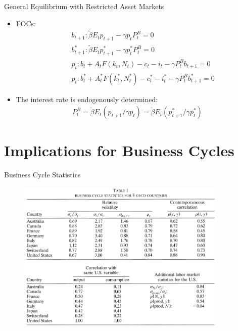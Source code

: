 \documentclass[10pt]{beamer}
\begin{document}
\begin{frame}{General Equilibrium with Restricted Asset Markets}
\begin{itemize}
\item FOCs:
\begin{eqnarray}
&&b_{t+1}:\tilde{\beta}E_tp_{t+1}-\gamma p_tP_t^B=0 \\
&&b_{t+1}^*:\tilde{\beta}E_tp_{t+1}^*-\gamma p_t^*P_t^B=0 \\
&&p_t:b_t+A_tF(k_t,N_t)-c_t-i_t-\gamma P_t^Bb_{t+1}=0\\
&&p_t:b_t^*+A_t^*F(k_t^*,N_t^*)-c_t^*-i_t^*-\gamma P_t^Bb_{t+1}^*=0
\end{eqnarray}
\item The interest rate is endogenously determined:
\begin{eqnarray*}
P_t^B=\tilde{\beta}E_t(p_{t+1}/\gamma p_t)=\tilde{\beta}E_t(p_{t+1}^*/\gamma p_t^*)
\end{eqnarray*}
\end{itemize}

\end{frame}

\section[Implications]{Implications for Business Cycles}
\begin{frame}{Business Cycle Statistics}
\begin{figure}[thbp]
  \centering
  \includegraphics[width=0.90\textwidth]{1.png}
\end{figure}
\end{frame}
\end{document}
